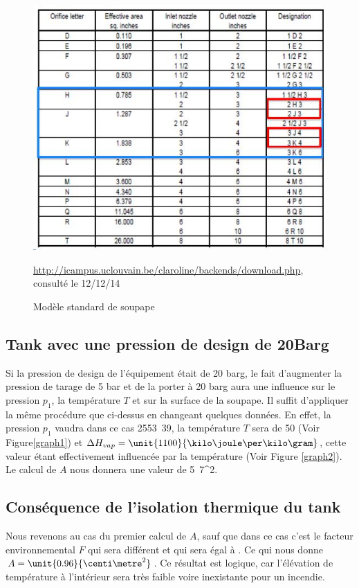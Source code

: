 \begin{figure}[ht!]
\centering
\includegraphics[scale=0.4]{tab.jpg}
\caption{Modèle standard de soupape}
\small \url{http://icampus.uclouvain.be/claroline/backends/download.php}, consulté le 12/12/14
\label{tab}
\end{figure}

\subsection{Tank avec une pression de design de \unit{20}{Barg}}
Si la pression de design de l’équipement était de 20 barg, le fait d’augmenter la pression de tarage de 5 bar et de la porter à 20 barg aura une influence sur le pression $p_1$, la température $T$ et sur la surface de la soupape.
Il suffit d'appliquer la même procédure que ci-dessus en changeant quelques données. En effet, la pression $p_1$ vaudra dans ce cas \unit{2553.39}{\kilo \pascal}, la température $T$ sera de \unit{50}{\celsius} (Voir Figure\ref{graph1}) et $\Delta H_{vap}=\unit{1100}{\kilo \joule \per \kilo \gram}$, cette valeur étant effectivement influencée par la température (Voir Figure \ref{graph2}). Le calcul de $A$ nous donnera une valeur de \unit{5.7}{\centi \metre^2}.

\subsection{Conséquence de l'isolation thermique du tank}

Nous revenons au cas du premier calcul de $A$, sauf que dans ce cas c'est le facteur environnemental $F$ qui sera différent et qui sera égal à . Ce qui nous donne $A=\unit{0.96}{\centi \metre^2}$. Ce résultat est logique, car l'élévation de température à l'intérieur sera très faible voire inexistante pour un incendie.

